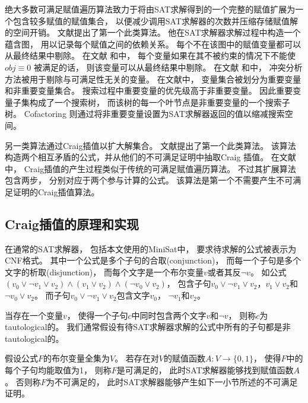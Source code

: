 绝大多数可满足赋值遍历算法致力于将由SAT求解得到的一个完整的赋值扩展为一个包含较多赋值的赋值集合，
以便减少调用SAT求解器的次数并压缩存储赋值解的空间开销。
文献提出了第一个此类算法。
他在SAT求解器求解过程中构造一个蕴含图，
用以记录每个赋值之间的依赖关系。
每个不在该图中的赋值变量都可以从最终结果中剔除。
在文献 和中，
每个变量如果在其不被约束的情况下不能使$obj\equiv 0$ 被满足的话，
则该变量可以从最终结果中剔除。
在文献 和中，
冲突分析方法被用于剔除与可满足性无关的变量。
在文献中，
变量集合被划分为重要变量和非重要变量集合。
搜索过程中重要变量的优先级高于非重要变量。
因此重要变量子集构成了一个搜索树，
而该树的每一个叶节点是非重要变量的一个搜索子树。
Cofactoring  则通过将非重要变量设置为SAT求解器返回的值以缩减搜索空间。

另一类算法通过Craig插值以扩大解集合。
文献提出了第一个此类算法。
该算法构造两个相互矛盾的公式，并从他们的不可满足证明中抽取Craig 插值。
在文献中，
Craig插值的产生过程类似于传统的可满足赋值遍历算法。
不过其扩展算法包含两步，
分别对应于两个参与计算的公式。
该算法是第一个不需要产生不可满足证明的Craig插值算法。

\subsection{Craig插值的原理和实现}\label{sec_craigimp}
在通常的SAT求解器，
包括本文使用的MiniSat中，
要求待求解的公式被表示为CNF格式。
其中一个公式是多个子句的合取(conjunction)，
而每一个子句是多个文字的析取(disjunction)，
而每个文字是一个布尔变量$v$或者其反$\neg v$。
如公式$(v_0\vee\neg v_1\vee v_2)\wedge(v_1\vee v_2)\wedge(\neg v_0\vee v_2)$，
包含子句$v_0\vee\neg v_1\vee v_2$，$v_1\vee v_2$和$\neg v_0\vee v_2$。
而子句$v_0\vee\neg v_1\vee v_2$包含文字$v_0$， $\neg v_1$和$v_2$。

当存在一个变量$v$，
使得一个子句$c$中同时包含两个文字$v$和$\neg v$，
则称$c$为tautological的。
我们通常假设有待SAT求解器求解的公式中所有的子句都是非tautological的。

假设公式$F$的布尔变量全集为$V$。
若存在对$V$的赋值函数$A:V\to \{0,1\}$，
使得$F$中的每个子句均能取值为1，
则称$F$是可满足的，
此时SAT求解器能够找到赋值函数$A$。
否则称$F$为不可满足的，
此时SAT求解器能够产生如下一小节所述的不可满足证明。

